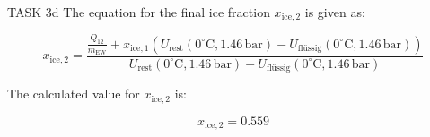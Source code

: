 TASK 3d  
The equation for the final ice fraction \( x_{\text{ice},2} \) is given as:  

\[
x_{\text{ice},2} = \frac{\frac{Q_{12}}{m_{\text{EW}}} + x_{\text{ice},1} \left( U_{\text{rest}}(0^\circ\text{C}, 1.46 \, \text{bar}) - U_{\text{flüssig}}(0^\circ\text{C}, 1.46 \, \text{bar}) \right)}{U_{\text{rest}}(0^\circ\text{C}, 1.46 \, \text{bar}) - U_{\text{flüssig}}(0^\circ\text{C}, 1.46 \, \text{bar})}
\]

The calculated value for \( x_{\text{ice},2} \) is:  

\[
x_{\text{ice},2} = 0.559
\]